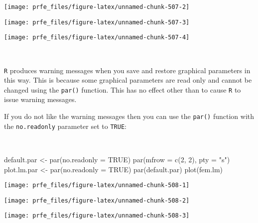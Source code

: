 \documentclass[
  12pt,
  a4paper]{book}
\newenvironment{Shaded}{\begin{snugshade}}{\end{snugshade}}
\newcommand{\AttributeTok}[1]{\textcolor[rgb]{0.77,0.63,0.00}{#1}}
\newcommand{\ConstantTok}[1]{\textcolor[rgb]{0.00,0.00,0.00}{#1}}
\newcommand{\DecValTok}[1]{\textcolor[rgb]{0.00,0.00,0.81}{#1}}
\newcommand{\FunctionTok}[1]{\textcolor[rgb]{0.00,0.00,0.00}{#1}}
\newcommand{\NormalTok}[1]{#1}
\newcommand{\OtherTok}[1]{\textcolor[rgb]{0.56,0.35,0.01}{#1}}
\newcommand{\StringTok}[1]{\textcolor[rgb]{0.31,0.60,0.02}{#1}}
\begin{document}
\begin{center}\texttt{[image: prfe\_files/figure-latex/unnamed-chunk-507-2]} \end{center}

\begin{center}\texttt{[image: prfe\_files/figure-latex/unnamed-chunk-507-3]} \end{center}

\begin{center}\texttt{[image: prfe\_files/figure-latex/unnamed-chunk-507-4]} \end{center}

~

\texttt{R} produces warning messages when you save and restore graphical parameters in this way. This is because some graphical parameters are read only and cannot be changed using the \texttt{par()} function. This has no effect other than to cause \texttt{R} to issue warning messages.

If you do not like the warning messages then you can use the \texttt{par()} function with the \texttt{no.readonly} parameter set to \texttt{TRUE}:

~

\begin{Shaded}
\begin{Highlighting}[]
\NormalTok{default.par }\OtherTok{\textless{}{-}} \FunctionTok{par}\NormalTok{(}\AttributeTok{no.readonly =} \ConstantTok{TRUE}\NormalTok{)}
\FunctionTok{par}\NormalTok{(}\AttributeTok{mfrow =} \FunctionTok{c}\NormalTok{(}\DecValTok{2}\NormalTok{, }\DecValTok{2}\NormalTok{), }\AttributeTok{pty =} \StringTok{"s"}\NormalTok{)}
\NormalTok{plot.lm.par }\OtherTok{\textless{}{-}} \FunctionTok{par}\NormalTok{(}\AttributeTok{no.readonly =} \ConstantTok{TRUE}\NormalTok{)}
\FunctionTok{par}\NormalTok{(default.par)}
\FunctionTok{plot}\NormalTok{(fem.lm)}
\end{Highlighting}
\end{Shaded}

\begin{center}\texttt{[image: prfe\_files/figure-latex/unnamed-chunk-508-1]} \end{center}

\begin{center}\texttt{[image: prfe\_files/figure-latex/unnamed-chunk-508-2]} \end{center}

\begin{center}\texttt{[image: prfe\_files/figure-latex/unnamed-chunk-508-3]} \end{center}
\end{document}
